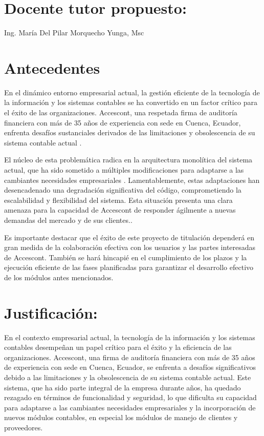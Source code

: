 \documentclass{article}
\begin{document}
\section{Docente tutor propuesto:   }
\begin{center}
Ing. María Del Pilar Morquecho Yunga, Msc
\end{center}
\section{Antecedentes}

En el dinámico entorno empresarial actual, la gestión eficiente de la tecnología de la información y los sistemas contables se ha convertido en un factor crítico para el éxito de las organizaciones. Accescont, una respetada firma de auditoría financiera con más de 35 años de experiencia con sede en Cuenca, Ecuador, enfrenta desafíos sustanciales derivados de las limitaciones y obsolescencia de su sistema contable actual \cite{CatacoraSI}.

El núcleo de esta problemática radica en la arquitectura monolítica del sistema actual, que ha sido sometido a múltiples modificaciones para adaptarse a las cambiantes necesidades empresariales \cite{HallSIC}. Lamentablemente, estas adaptaciones han desencadenado una degradación significativa del código, comprometiendo la escalabilidad y flexibilidad del sistema. Esta situación presenta una clara amenaza para la capacidad de Accescont de responder ágilmente a nuevas demandas del mercado y de sus clientes.\cite{HorngrenCC}.

Es importante destacar que el éxito de este proyecto de titulación dependerá en gran medida de la colaboración efectiva con los usuarios y las partes interesadas de Accescont. También se hará hincapié en el cumplimiento de los plazos y la ejecución eficiente de las fases planificadas para garantizar el desarrollo efectivo de los módulos antes mencionados.





       
 \section{Justificación:}

 En el contexto empresarial actual, la tecnología de la información y los sistemas contables desempeñan un papel crítico para el éxito y la eficiencia de las organizaciones. Accescont, una firma de auditoría financiera con más de 35 años de experiencia con sede en Cuenca, Ecuador, se enfrenta a desafíos significativos debido a las limitaciones y la obsolescencia de su sistema contable actual. Este sistema, que ha sido parte integral de la empresa durante años, ha quedado rezagado en términos de funcionalidad y seguridad, lo que dificulta su capacidad para adaptarse a las cambiantes necesidades empresariales y la incorporación de nuevos módulos contables, en especial los módulos de manejo de clientes y proveedores.
 
\end{document}

